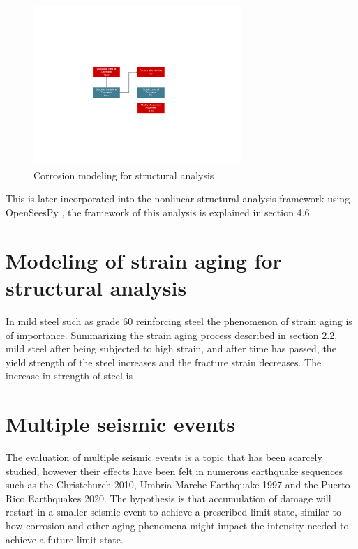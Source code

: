\begin{figure}[htbp]
	\centering
	\includegraphics[width=0.7\textwidth]{Chapter-4/figs/Corrosion_Modeling}
	\caption{Corrosion modeling for structural analysis}
	\label{fig:CorrModel}
\end{figure}

This is later incorporated into the nonlinear structural analysis framework using OpenSeesPy \cite{McKenna2010}\cite{Zhu2018}, the framework of this analysis is explained in section 4.6.

\section{Modeling of strain aging for structural analysis}
In mild steel such as grade 60 reinforcing steel the phenomenon of strain aging is of importance. Summarizing the strain aging process described in section 2.2, mild steel after being subjected to high strain, and after time has passed, the yield strength of the steel increases and the fracture strain decreases. The increase in strength of steel is 

\section{Multiple seismic events}

The evaluation of multiple seismic events is a topic that has been scarcely studied, however their effects have been felt in numerous earthquake sequences such as the Christchurch 2010, Umbria-Marche Earthquake 1997 and the Puerto Rico Earthquakes 2020. The hypothesis is that accumulation of damage will restart in a smaller seismic event to achieve a prescribed limit state, similar to how corrosion and other aging phenomena might impact the intensity needed to achieve a future limit state. 

